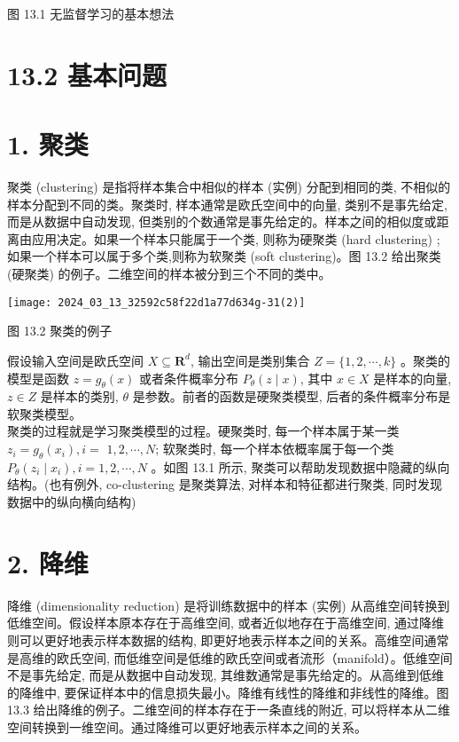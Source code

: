 \documentclass[10pt]{article}
\begin{document}
\begin{CJK*}{UTF8}{bsmi}
图 13.1 无监督学习的基本想法

\section*{13.2 基本问题}
\section*{1. 聚类}
聚类 (clustering) 是指将样本集合中相似的样本 (实例) 分配到相同的类, 不相似的样本分配到不同的类。聚类时, 样本通常是欧氏空间中的向量, 类别不是事先给定, 而是从数据中自动发现, 但类别的个数通常是事先给定的。样本之间的相似度或距离由应用决定。如果一个样本只能属于一个类, 则称为硬聚类 (hard clustering) ; 如果一个样本可以属于多个类,则称为软聚类 (soft clustering)。图 13.2 给出聚类 (硬聚类) 的例子。二维空间的样本被分到三个不同的类中。

\begin{center}
\texttt{[image: 2024\_03\_13\_32592c58f22d1a77d634g-31(2)]}
\end{center}

图 13.2 聚类的例子

假设输入空间是欧氏空间 $X \subseteq \boldsymbol{R}^{d}$, 输出空间是类别集合 $Z=\{1,2, \cdots, k\}$ 。聚类的模型是函数 $z=g_{\theta}(x)$ 或者条件概率分布 $P_{\theta}(z \mid x)$, 其中 $x \in X$ 是样本的向量, $z \in Z$ 是样本的类别, $\theta$ 是参数。前者的函数是硬聚类模型, 后者的条件概率分布是软聚类模型。\\
聚类的过程就是学习聚类模型的过程。硬聚类时, 每一个样本属于某一类 $z_{i}=g_{\theta}\left(x_{i}\right), i=$ $1,2, \cdots, N$; 软聚类时, 每一个样本依概率属于每一个类 $P_{\theta}\left(z_{i} \mid x_{i}\right), i=1,2, \cdots, N$ 。如图 13.1 所示, 聚类可以帮助发现数据中隐藏的纵向结构。(也有例外, co-clustering 是聚类算法, 对样本和特征都进行聚类, 同时发现数据中的纵向横向结构)

\section*{2. 降维}
降维 (dimensionality reduction) 是将训练数据中的样本 (实例) 从高维空间转换到低维空间。假设样本原本存在于高维空间, 或者近似地存在于高维空间, 通过降维则可以更好地表示样本数据的结构, 即更好地表示样本之间的关系。高维空间通常是高维的欧氏空间, 而低维空间是低维的欧氏空间或者流形（manifold）。低维空间不是事先给定, 而是从数据中自动发现, 其维数通常是事先给定的。从高维到低维的降维中, 要保证样本中的信息损失最小。降维有线性的降维和非线性的降维。图 13.3 给出降维的例子。二维空间的样本存在于一条直线的附近, 可以将样本从二维空间转换到一维空间。通过降维可以更好地表示样本之间的关系。


\end{CJK*}
\end{document}
